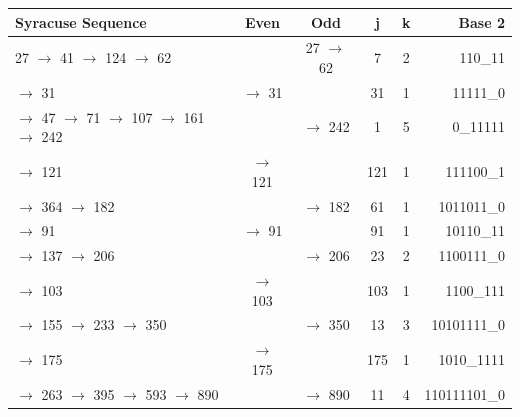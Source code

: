 \documentclass[letterpaper]{article}
\begin{document}
\begin{multicols}{2}
    \noindent
    \begin{minipage}{\columnwidth}
        \setlength{\tabcolsep}{.35\tabcolsep}
        \centering
        \begin{tabular}{|l|c|c|c|c|r|}
            \hline
            \textbf{Syracuse Sequence}                      & \textbf{Even} & \textbf{Odd} & \textbf{j} & \textbf{k} & \textbf{Base 2} \\
            \hline
            27 $\to$ 41 $\to$ 124 $\to$ 62                  &               & 27 $\to$ 62  & 7          & 2          & 110\_11         \\
            \hline
            $\to$ 31                                        & $\to$ 31      &              & 31         & 1          & 11111\_0        \\
            \hline
            $\to$ 47 $\to$ 71 $\to$ 107 $\to$ 161 $\to$ 242 &               & $\to$ 242    & 1          & 5          & 0\_11111        \\
            \hline
            $\to$ 121                                       & $\to$ 121     &              & 121        & 1          & 111100\_1       \\
            \hline
            $\to$ 364 $\to$ 182                             &               & $\to$ 182    & 61         & 1          & 1011011\_0      \\
            \hline
            $\to$ 91                                        & $\to$ 91      &              & 91         & 1          & 10110\_11       \\
            \hline
            $\to$ 137 $\to$ 206                             &               & $\to$ 206    & 23         & 2          & 1100111\_0      \\
            \hline
            $\to$ 103                                       & $\to$ 103     &              & 103        & 1          & 1100\_111       \\
            \hline
            $\to$ 155 $\to$ 233 $\to$ 350                   &               & $\to$ 350    & 13         & 3          & 10101111\_0     \\
            \hline
            $\to$ 175                                       & $\to$ 175     &              & 175        & 1          & 1010\_1111      \\
            \hline
            $\to$ 263 $\to$ 395 $\to$ 593 $\to$ 890         &               & $\to$ 890    & 11         & 4          & 110111101\_0    \\
            \hline
        \end{tabular}
    \end{minipage}


\end{multicols}
\end{document}
